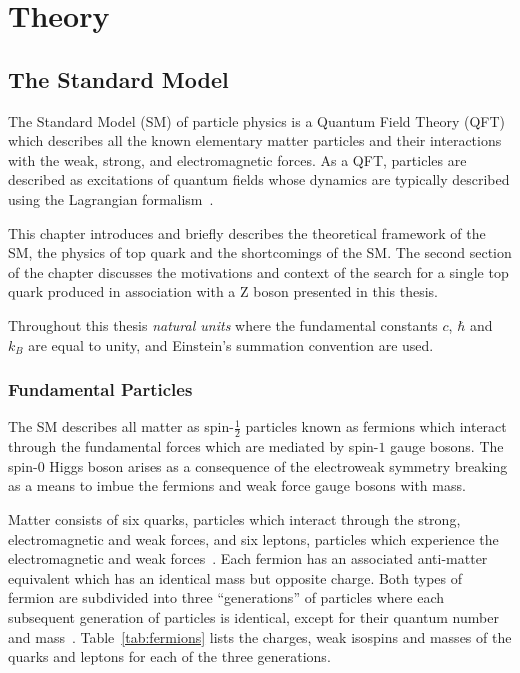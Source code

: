 \chapter{Theory}\label{chapter:theory}
\section{The Standard Model}\label{sec:sm}
The Standard Model (SM) of particle physics is a Quantum Field Theory (QFT) which describes all the known elementary matter particles and their interactions with the weak, strong, and electromagnetic forces.
As a QFT, particles are described as excitations of quantum fields whose dynamics are typically described using the Lagrangian formalism~\cite{LagrangiansSM}.

This chapter introduces and briefly describes the theoretical framework of the SM, the physics of top quark and the shortcomings of the SM.
The second section of the chapter discusses the motivations and context of the search for a single top quark produced in association with a Z boson presented in this thesis.

Throughout this thesis \emph{natural units} where the fundamental constants $c$, $\hbar$ and $k_{B}$ are equal to unity, and Einstein's summation convention are used.

\subsection{Fundamental Particles}\label{subsec:particles}
The SM describes all matter as spin-$\frac{1}{2}$ particles known as fermions which interact through the fundamental forces which are mediated by spin-$1$ gauge bosons.
The spin-$0$ Higgs boson arises as a consequence of the electroweak symmetry breaking as a means to imbue the fermions and weak force gauge bosons with mass.

Matter consists of six quarks, particles which interact through the strong, electromagnetic and weak forces, and six leptons, particles which experience the electromagnetic and weak forces~\cite{LagrangiansSM}.
Each fermion has an associated anti-matter equivalent which has an identical mass but opposite charge.
Both types of fermion are subdivided into three ``generations'' of particles where each subsequent generation of particles is identical, except for their quantum number and mass~\cite{ElectroweakStrong}.
Table~\ref{tab:fermions} lists the charges, weak isospins and masses of the quarks and leptons for each of the three generations.

